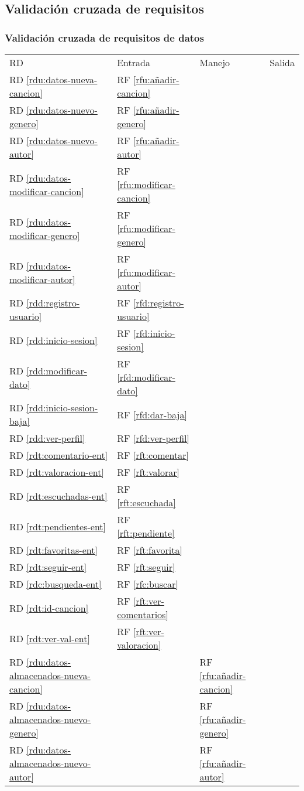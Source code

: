 \subsection{Validación cruzada de requisitos}

\subsubsection{Validación cruzada de requisitos de datos}
\keepXColumns
\begin{tabularx}{\linewidth}{l|XXX}
  RD & Entrada & Manejo & Salida \\
  RD \ref{rdu:datos-nueva-cancion} & RF \ref{rfu:añadir-cancion} & & \\
  RD \ref{rdu:datos-nuevo-genero} & RF \ref{rfu:añadir-genero} & & \\
  RD \ref{rdu:datos-nuevo-autor} & RF \ref{rfu:añadir-autor} \\
  RD \ref{rdu:datos-modificar-cancion} & RF \ref{rfu:modificar-cancion} & & \\
  RD \ref{rdu:datos-modificar-genero} & RF \ref{rfu:modificar-genero} & & \\
  RD \ref{rdu:datos-modificar-autor} & RF \ref{rfu:modificar-autor} \\
  RD \ref{rdd:registro-usuario} & RF \ref{rfd:registro-usuario} & & \\
  RD \ref{rdd:inicio-sesion} & RF \ref{rfd:inicio-sesion} & & \\
  RD \ref{rdd:modificar-dato} & RF \ref{rfd:modificar-dato} & & \\
  RD \ref{rdd:inicio-sesion-baja} & RF \ref{rfd:dar-baja} & & \\
  RD \ref{rdd:ver-perfil} & RF \ref{rfd:ver-perfil} & & \\
  RD \ref{rdt:comentario-ent} & RF \ref{rft:comentar} & & \\
  RD \ref{rdt:valoracion-ent} & RF \ref{rft:valorar} & & \\
  RD \ref{rdt:escuchadas-ent} & RF \ref{rft:escuchada} & & \\
  RD \ref{rdt:pendientes-ent} & RF \ref{rft:pendiente} & & \\
  RD \ref{rdt:favoritas-ent} & RF \ref{rft:favorita} & & \\
  RD \ref{rdt:seguir-ent} & RF \ref{rft:seguir} & & \\
  RD \ref{rdc:busqueda-ent} & RF \ref{rfc:buscar} & & \\
  RD \ref{rdt:id-cancion}  & RF \ref{rft:ver-comentarios} & & \\
  RD \ref{rdt:ver-val-ent} & RF \ref{rft:ver-valoracion} & & \\
  RD \ref{rdu:datos-almacenados-nueva-cancion} & & RF \ref{rfu:añadir-cancion} & \\
  RD \ref{rdu:datos-almacenados-nuevo-genero} & & RF \ref{rfu:añadir-genero} & \\
  RD \ref{rdu:datos-almacenados-nuevo-autor} & & RF \ref{rfu:añadir-autor} & \\


\end{tabularx}
